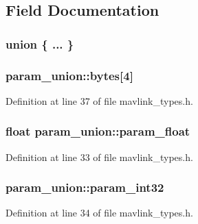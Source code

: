 \subsection{Field Documentation}
\hypertarget{structparam__union_a3e627016bbfed55958338fd5b232a98c}{\subsubsection[{"@1}]{\setlength{\rightskip}{0pt plus 5cm}union \{ ... \} }}\label{structparam__union_a3e627016bbfed55958338fd5b232a98c}
\hypertarget{structparam__union_a2a806761f2869448bb842d1dc78e1c74}{
\subsubsection[{bytes}]{ param\-\_\-union\-::bytes\mbox{[}4\mbox{]}}}\label{structparam__union_a2a806761f2869448bb842d1dc78e1c74}


Definition at line 37 of file mavlink\-\_\-types.\-h.

\hypertarget{structparam__union_afcfa880ccb1ace3c6a26e2bf008563aa}{
\subsubsection[{param\-\_\-float}]{\setlength{\rightskip}{0pt plus 5cm}float param\-\_\-union\-::param\-\_\-float}}\label{structparam__union_afcfa880ccb1ace3c6a26e2bf008563aa}


Definition at line 33 of file mavlink\-\_\-types.\-h.

\hypertarget{structparam__union_a30808fc70851f9723566285dce61a336}{
\subsubsection[{param\-\_\-int32}]{ param\-\_\-union\-::param\-\_\-int32}}\label{structparam__union_a30808fc70851f9723566285dce61a336}


Definition at line 34 of file mavlink\-\_\-types.\-h.

